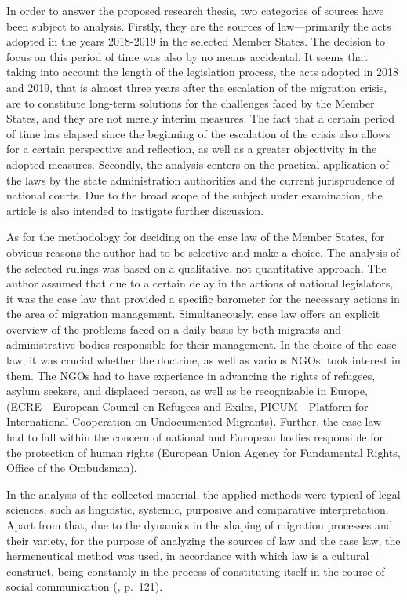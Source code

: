 \documentclass[10pt,a4paper]{article}
\begin{document}
\begin{multicols}{2}
In order to answer the proposed research thesis, two categories of sources have been subject to analysis. Firstly, they are the sources of law---primarily the acts adopted in the years 2018-2019 in the selected Member States. The decision to focus on this period of time was also by no means accidental. It seems that taking into account the length of the legislation process, the acts adopted in 2018 and 2019, that is almost three years after the escalation of the migration crisis, are to constitute long-term solutions for the challenges faced by the Member States, and they are not merely interim measures. The fact that a certain period of time has elapsed since the beginning of the escalation of the crisis also allows for a certain perspective and reflection, as well as a greater objectivity in the adopted measures. Secondly, the analysis centers on the practical application of the laws by the state administration authorities and the current jurisprudence of national courts. Due to the broad scope of the subject under examination, the article is also intended to instigate further discussion.

As for the methodology for deciding on the case law of the Member States, for obvious reasons the author had to be selective and make a choice. The analysis of the selected rulings was based on a qualitative, not quantitative approach. The author assumed that due to a certain delay in the actions of national legislators, it was the case law that provided a specific barometer for the necessary actions in the area of migration management. Simultaneously, case law offers an explicit overview of the problems faced on a daily basis by both migrants and administrative bodies responsible for their management. In the choice of the case law, it was crucial whether the doctrine, as well as various NGOs, took interest in them. The NGOs had to have experience in advancing the rights of refugees, asylum seekers, and displaced person, as well as be recognizable in Europe, (ECRE---European Council on Refugees and Exiles, PICUM---Platform for International Cooperation on Undocumented Migrants). Further, the case law had to fall within the concern of national and European bodies responsible for the protection of human rights (European Union Agency for Fundamental Rights, Office of the Ombudsman).

In the analysis of the collected material, the applied methods were typical of legal sciences, such as linguistic, systemic, purposive and comparative interpretation. Apart from that, due to the dynamics in the shaping of migration processes and their variety, for the purpose of analyzing the sources of law and the case law, the hermeneutical method was used, in accordance with which law is a cultural construct, being constantly in the process of constituting itself in the course of social communication (\citep{R29}, p.~121).


\end{multicols}
\end{document}

